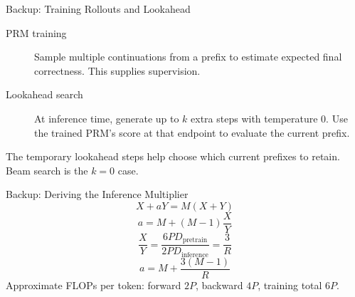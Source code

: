 \documentclass[aspectratio=1610,xcolor=dvipsnames,t]{beamer}
\newcommand{\papersource}[1]{}
\begin{document}
\begin{frame}{Backup: Training Rollouts and Lookahead}
  \begin{description}
    \item[PRM training] Sample multiple continuations from a prefix to estimate expected final correctness. This supplies supervision.
    \item[Lookahead search] At inference time, generate up to $k$ extra steps with temperature 0. Use the trained PRM's score at that endpoint to evaluate the current prefix.
  \end{description}
  \par\medskip
  The temporary lookahead steps help choose which current prefixes to retain. Beam search is the $k=0$ case.
  \papersource{Sections 5.1--5.2.}
\end{frame}

\begin{frame}{Backup: Deriving the Inference Multiplier}
  \[
    X+aY=M(X+Y)
  \]
  \[
    a=M+(M-1)\frac{X}{Y}
  \]
  \[
    \frac{X}{Y}=\frac{6PD_{\mathrm{pretrain}}}{2PD_{\mathrm{inference}}}
    =\frac{3}{R}
  \]
  \[
    \boxed{a=M+\frac{3(M-1)}{R}}
  \]
  Approximate FLOPs per token: forward $2P$, backward $4P$, training total $6P$.
  \papersource{Section 7.}
\end{frame}
\end{document}
